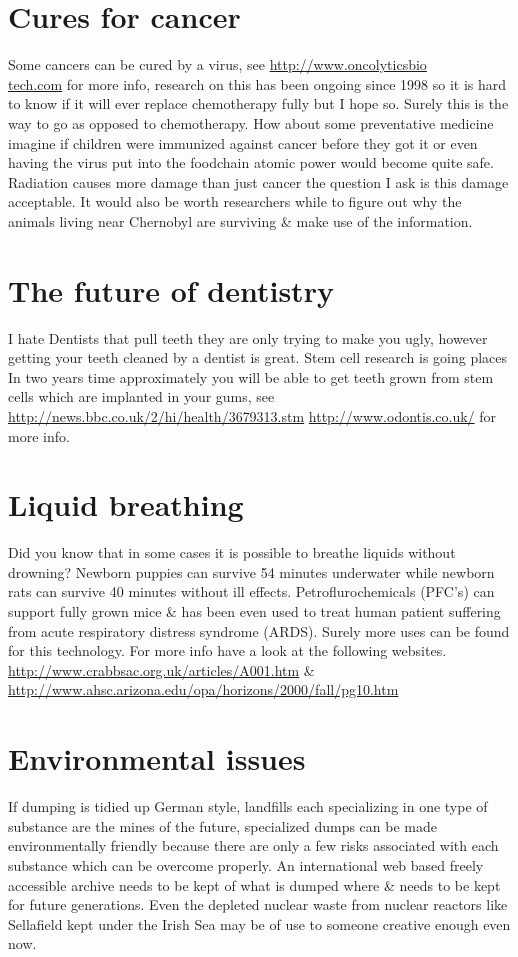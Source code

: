 \documentclass[a4paper,12pt,titlepage]{book}
\begin{document}
\section{Cures for cancer}
Some cancers can be cured by a virus, see
\url{http://www.oncolyticsbio}\\
\url{tech.com} for more info,
research on this has been ongoing since 1998 so it is
hard to know if it will ever replace chemotherapy fully
but I hope so.
Surely this is the way to go as opposed to chemotherapy.
How about some preventative medicine imagine if children
were immunized against cancer before they got it or
even having the virus put into the foodchain atomic
power would become quite safe.
Radiation causes more damage than just cancer the question I ask is this
damage acceptable. It would also be worth
researchers while to figure out why the animals
living near Chernobyl are surviving \& make use of
the information.

\section{The future of dentistry}
I hate Dentists that pull teeth they are only
trying to make you ugly, however getting your
teeth cleaned by a dentist is great.
Stem cell research is going places
In two years time approximately you will be able
to get teeth grown from stem cells which
are implanted in your gums, see
\url{http://news.bbc.co.uk/2/hi/health/3679313.stm}
\url{http://www.odontis.co.uk/} for more info.

\section{Liquid breathing}
Did you know that in some cases it is possible
to breathe liquids without drowning?
Newborn puppies can survive 54 minutes underwater
while newborn rats can survive 40 minutes without
ill effects. Petroflurochemicals (PFC's)
can support fully grown mice \& has been
even used to treat human patient suffering from
acute respiratory distress syndrome (ARDS).
Surely more uses can be found for this technology.
For more info have a look at the following websites.
\url{http://www.crabbsac.org.uk/articles/A001.htm} \&
\url{http://www.ahsc.arizona.edu/opa/horizons/2000/fall/pg10.htm}

\section{Environmental issues}
If dumping is tidied up German style,
landfills each specializing in one type of substance
are the mines of the future, specialized dumps
can be made environmentally friendly because
there are only a few risks associated with
each substance which can be overcome properly.
An international web based freely accessible archive needs to be kept of 
what is dumped where \& needs to be kept for future generations.
Even the depleted nuclear waste from nuclear reactors like Sellafield
kept under the Irish Sea may be of use to someone
creative enough even now.
\end{document}
